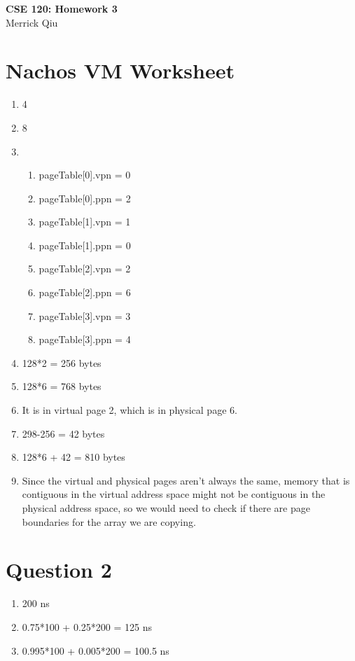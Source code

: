 \documentclass{article}
\begin{document}
\begin{center}
	\huge{\bf CSE 120: Homework 3} \\
	Merrick Qiu
\end{center}

\section*{Nachos VM Worksheet}
\begin{enumerate}
    \item 4
    \item 8
    \item \begin{enumerate}
        \item pageTable[0].vpn = 0
        \item pageTable[0].ppn = 2
        \item pageTable[1].vpn = 1
        \item pageTable[1].ppn = 0
        \item pageTable[2].vpn = 2
        \item pageTable[2].ppn = 6
        \item pageTable[3].vpn = 3
        \item pageTable[3].ppn = 4
    \end{enumerate}
    \item 128*2 = 256 bytes
    \item 128*6 = 768 bytes
    \item It is in virtual page 2, which is in physical page 6.
    \item 298-256 = 42 bytes
    \item 128*6 + 42 = 810 bytes
    \item Since the virtual and physical pages aren't always the same,
    memory that is contiguous in the virtual address space might not be contiguous in the physical address space,
    so we would need to check if there are page boundaries for the array we are copying.
\end{enumerate}

\section*{Question 2}
\begin{enumerate}
    \item 200 ns 
    \item 0.75*100 + 0.25*200 = 125 ns 
    \item 0.995*100 + 0.005*200 = 100.5 ns
\end{enumerate}
\end{document}
